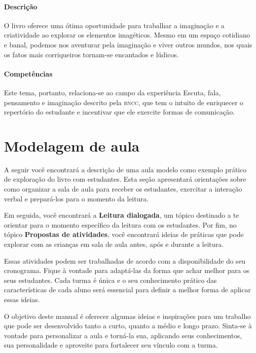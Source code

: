 \documentclass[11pt]{extarticle}
\begin{document}
\paragraph{Descrição} O livro oferece uma ótima oportunidade para trabalhar a imaginação e a criatividade ao explorar os elementos imagéticos. Mesmo em um espaço cotidiano e banal, podemos nos aventurar pela imaginação e viver outros mundos, nos quais os fatos mais corriqueiros tornam-se encantados e lúdicos.

\paragraph{Competências} Este tema, portanto, 
relaciona-se ao campo da experiência Escuta, fala, pensamento e imaginação 
descrito pela \textsc{bncc}, que tem o intuito de enriquecer o repertório do estudante 
e incentivar que ele exercite formas de comunicação.


\section{Modelagem de aula}
A seguir você encontrará a descrição de uma aula modelo como exemplo 
prático de exploração do livro com estudantes. Esta seção apresentará 
orientações sobre como organizar a sala de aula para receber os 
estudantes, exercitar a interação verbal e prepará-los para o 
momento da leitura.

Em seguida, você encontrará a \textbf{Leitura dialogada}, um 
tópico destinado a te orientar para o momento específico da 
leitura com os estudantes. Por fim, no tópico 
\textbf{Propostas de atividades}, você encontrará ideias 
de práticas que pode explorar com as crianças em sala de 
aula antes, após e durante a leitura. 

Essas atividades podem ser trabalhadas de acordo com a 
disponibilidade do seu cronograma. Fique à vontade para adaptá-las 
da forma que achar melhor para os seus estudantes. Cada turma é única 
e o seu conhecimento prático das características de cada aluno será 
essencial para definir a melhor forma de aplicar essas ideias. 

O objetivo deste manual é oferecer algumas ideias 
e inspirações para um trabalho que pode ser desenvolvido tanto 
a curto, quanto a médio e longo prazo. Sinta-se à vontade para 
personalizar a aula e torná-la sua, aplicando seus conhecimentos, sua 
personalidade e aproveite para fortalecer 
seu vínculo com a turma.
\end{document}
